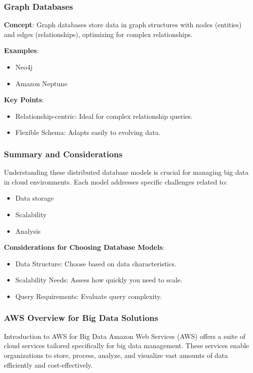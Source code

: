 \documentclass[aspectratio=169]{beamer}
\begin{document}
\begin{frame}[fragile]
    \frametitle{Graph Databases}
    \textbf{Concept}: 
    Graph databases store data in graph structures with nodes (entities) and edges (relationships), optimizing for complex relationships.

    \textbf{Examples}:
    \begin{itemize}
        \item Neo4j
        \item Amazon Neptune
    \end{itemize}

    \textbf{Key Points}:
    \begin{itemize}
        \item Relationship-centric: Ideal for complex relationship queries.
        \item Flexible Schema: Adapts easily to evolving data.
    \end{itemize}
\end{frame}

\begin{frame}[fragile]
    \frametitle{Summary and Considerations}
    Understanding these distributed database models is crucial for managing big data in cloud environments. Each model addresses specific challenges related to:
    \begin{itemize}
        \item Data storage
        \item Scalability
        \item Analysis
    \end{itemize}

    \textbf{Considerations for Choosing Database Models}:
    \begin{itemize}
        \item Data Structure: Choose based on data characteristics.
        \item Scalability Needs: Assess how quickly you need to scale.
        \item Query Requirements: Evaluate query complexity.
    \end{itemize}
\end{frame}

\begin{frame}
    \frametitle{AWS Overview for Big Data Solutions}
    \begin{block}{Introduction to AWS for Big Data}
        Amazon Web Services (AWS) offers a suite of cloud services tailored specifically for big data management. These services enable organizations to store, process, analyze, and visualize vast amounts of data efficiently and cost-effectively.
    \end{block}
\end{frame}
\end{document}
